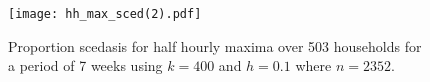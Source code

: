 
\begin{figure}
\centering
\texttt{[image: hh\_max\_sced(2).pdf]}
\caption{\label{fig:mysced_hh_max} Proportion scedasis for half hourly maxima over 503 households for a period of 7 weeks using $k=400$ and $h=0.1$ where $n=2352$.}
\end{figure}


